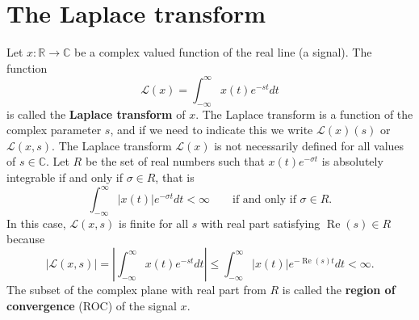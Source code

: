 \documentclass[11pt,a4paper]{book}
\theoremstyle{plain}
\numberwithin{equation}{section}
\newcommand{\reals}{{\mathbb R}}
\newcommand{\complex}{{\mathbb C}}
\renewcommand{\Re}{\operatorname{Re}}
\newcommand{\term}{\textbf}
\newcommand{\abs}[1]{\left\vert #1 \right\vert}
\newcommand{\sabs}[1]{\vert #1 \vert}
\begin{document}
\chapter{The Laplace transform} \label{sec:laplace-transform}

\newcommand*{\calL}{\mathcal L}


Let $x \colon \reals \to \complex$ be a complex valued function of the real line (a signal).  The function
\begin{equation}\label{eq:laplace_defn}
\calL(x) = \int_{-\infty}^{\infty} x(t) e^{-st} dt
\end{equation}
is called the \term{Laplace transform} of $x$.  The Laplace transform is a function of the complex parameter $s$, and if we need to indicate this we write $\calL(x)(s)$ or $\calL(x,s)$.  The Laplace transform $\calL(x)$ is not necessarily defined for all values of $s \in \complex$.  
Let $R$ be the set of real numbers such that $x(t) e^{-\sigma t}$ is absolutely integrable if and only if $\sigma \in R$, that is
\[
\int_{-\infty}^{\infty} \abs{x(t)} e^{-\sigma t} dt < \infty  \qquad \text{if and only if $\sigma \in R$}.
\]
In this case, $\calL(x,s)$ is finite for all $s$ with real part satisfying $\Re(s) \in R$ because 
\[
\sabs{\calL(x,s)} = \abs{\int_{-\infty}^{\infty} x(t) e^{-st} dt} \leq \int_{-\infty}^{\infty} \abs{x(t)} e^{-\Re(s) t} dt < \infty.
\]
The subset of the complex plane with real part from $R$ is called the \term{region of convergence} (ROC) of the signal $x$.  %
\end{document}
